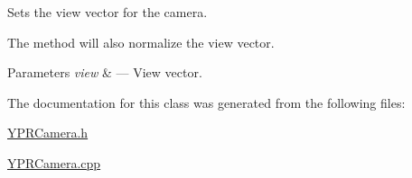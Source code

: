 Sets the view vector for the camera. 

The method will also normalize the view vector.


\begin{DoxyParams}{Parameters}
{\em view} & --- View vector. \\
\hline
\end{DoxyParams}


The documentation for this class was generated from the following files\+:\begin{DoxyCompactItemize}
\item 
\hyperlink{_y_p_r_camera_8h}{Y\+P\+R\+Camera.\+h}\item 
\hyperlink{_y_p_r_camera_8cpp}{Y\+P\+R\+Camera.\+cpp}\end{DoxyCompactItemize}
